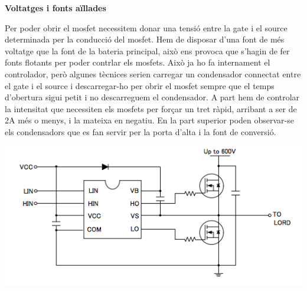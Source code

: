 \textbf{Voltatges i fonts aïllades} \newline \smallskip

Per poder obrir el mosfet necessitem donar una tensió entre la gate i el source determinada per la conducció del mosfet. Hem de disposar d'una font de més voltatge que la font de la bateria principal, això ens provoca que s'hagin de fer fonts flotants per poder contrlar els mosfets. Això ja ho fa internament el controlador, però algunes tècnices serien carregar un condensador connectat entre el gate i el source i descarregar-ho per obrir el mosfet sempre que el temps d'obertura sigui petit i no descarreguem el condensador. A part hem de controlar la intensitat que necessiten els mosfets per forçar un tret ràpid, arribant a ser de 2A més o menys, i la mateixa en negatiu. En la part superior poden observar-se els condensadors que es fan servir per la porta d'alta i la font de conversió.


\includegraphics[width=\textwidth]{Motors/600-V-HighLow-Side-Gate-Driver-1427853331}

